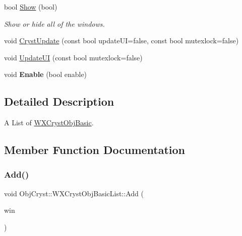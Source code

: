 \begin{DoxyCompactItemize}
\mbox{\label{class_obj_cryst_1_1_w_x_cryst_obj_basic_list_aa24e24922003988412c55e65f2fd669b}} 
bool \mbox{\hyperlink{class_obj_cryst_1_1_w_x_cryst_obj_basic_list_aa24e24922003988412c55e65f2fd669b}{Show}} (bool)
\begin{DoxyCompactList}\small\item\em Show or hide all of the windows. \end{DoxyCompactList}\item 
void \mbox{\hyperlink{class_obj_cryst_1_1_w_x_cryst_obj_basic_list_a96cbd9c8341467f21a38964c2838a9c2}{Cryst\+Update}} (const bool update\+UI=false, const bool mutexlock=false)
\item 
void \mbox{\hyperlink{class_obj_cryst_1_1_w_x_cryst_obj_basic_list_a64a74ecbcfb7a7066e73f0ffdfad2a98}{Update\+UI}} (const bool mutexlock=false)
\item 
\mbox{\label{class_obj_cryst_1_1_w_x_cryst_obj_basic_list_ae2988879821cb917b2a9ae19ceba6557}} 
void {\bfseries Enable} (bool enable)
\end{DoxyCompactItemize}


\subsection{Detailed Description}
A List of \mbox{\hyperlink{class_obj_cryst_1_1_w_x_cryst_obj_basic}{W\+X\+Cryst\+Obj\+Basic}}. 

\subsection{Member Function Documentation}
\mbox{\label{class_obj_cryst_1_1_w_x_cryst_obj_basic_list_a6630481e8f5e943935a8b1e8ebb826ea}} 
\subsubsection{\texorpdfstring{Add()}{Add()}}
{\footnotesize\ttfamily void Obj\+Cryst\+::\+W\+X\+Cryst\+Obj\+Basic\+List\+::\+Add (\begin{DoxyParamCaption}\item[{\mbox{\hyperlink{class_obj_cryst_1_1_w_x_cryst_obj_basic}{W\+X\+Cryst\+Obj\+Basic}} $\ast$}]{win }\end{DoxyParamCaption})}

